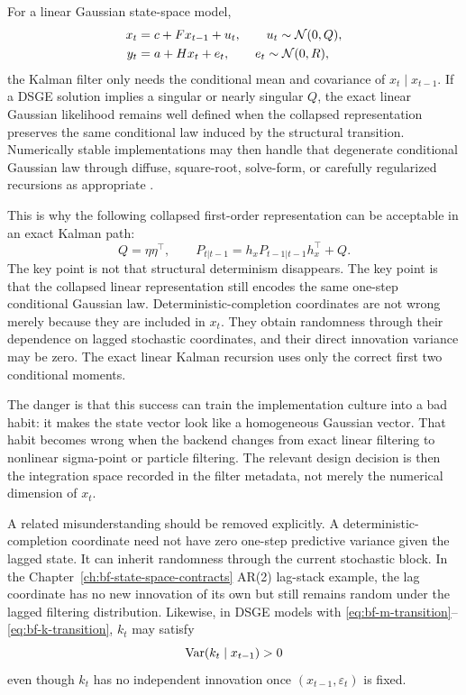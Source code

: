 For a linear Gaussian state-space model,
\begin{align}
  x_t &= c + F x_{t-1} + u_t,\qquad u_t \sim \mathcal{N}(0,Q),\\
  y_t &= a + H x_t + e_t,\qquad e_t \sim \mathcal{N}(0,R),
\end{align}
the Kalman filter only needs the conditional mean and covariance of
$x_t\mid x_{t-1}$.  If a DSGE solution implies a singular or nearly singular
$Q$, the exact linear Gaussian likelihood remains well defined when the
collapsed representation preserves the same conditional law induced by the
structural transition.  Numerically stable implementations may then handle that
degenerate conditional Gaussian law through diffuse, square-root, solve-form,
or carefully regularized recursions as appropriate \citep{durbin2012time}.

This is why the following collapsed first-order representation can be
acceptable in an exact Kalman path:
\[
  Q = \eta \eta^\top,\qquad
  P_{t|t-1} = h_x P_{t-1|t-1} h_x^\top + Q.
\]
The key point is not that structural determinism disappears.  The key point is
that the collapsed linear representation still encodes the same one-step
conditional Gaussian law.  Deterministic-completion coordinates are not wrong
merely because they are included in $x_t$.  They obtain randomness through
their dependence on lagged stochastic coordinates, and their direct innovation
variance may be zero.  The exact linear Kalman recursion uses only the correct
first two conditional moments.

The danger is that this success can train the implementation culture into a
bad habit: it makes the state vector look like a homogeneous Gaussian vector.
That habit becomes wrong when the backend changes from exact linear filtering
to nonlinear sigma-point or particle filtering.  The relevant design decision
is then the integration space recorded in the filter metadata, not merely the
numerical dimension of $x_t$.

A related misunderstanding should be removed explicitly.  A deterministic-
completion coordinate need not have zero one-step predictive variance given the
lagged state.  It can inherit randomness through the current stochastic block.
In the Chapter~\ref{ch:bf-state-space-contracts} AR(2) lag-stack example, the
lag coordinate has no new innovation of its own but still remains random under
the lagged filtering distribution.  Likewise, in DSGE models with
\eqref{eq:bf-m-transition}--\eqref{eq:bf-k-transition}, $k_t$ may satisfy
\begin{equation}
  \operatorname{Var}(k_t\mid x_{t-1}) > 0
\end{equation}
even though $k_t$ has no independent innovation once $(x_{t-1},\varepsilon_t)$
is fixed.

